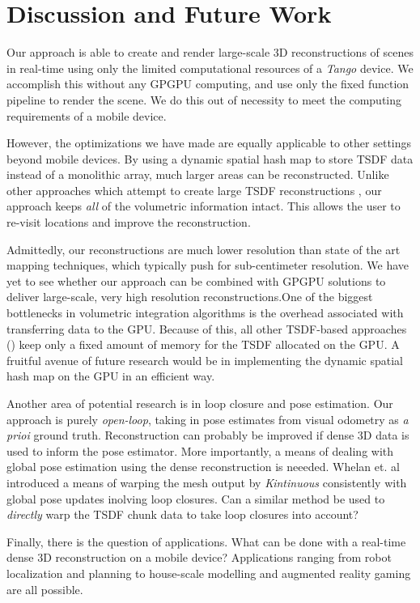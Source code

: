 \section{Discussion and Future Work}
Our approach is able to create and render large-scale 3D reconstructions of
scenes in real-time using only the limited computational resources of a
\textit{Tango} device. We accomplish this without any GPGPU computing, and use
only the fixed function pipeline to render the scene. We do this out of
necessity to meet the computing requirements of a mobile device.

However, the optimizations we have made are equally applicable to other
settings beyond mobile devices. By using a dynamic spatial hash map to store
TSDF data instead of a monolithic array, much larger areas can be
reconstructed. Unlike other approaches which attempt to create large TSDF
reconstructions \cite{Whelan2013}, our approach keeps \textit{all} of the
volumetric information intact. This allows the user to re-visit locations and
improve the reconstruction.

Admittedly, our reconstructions are much lower resolution than state of the art
mapping techniques, which typically push for sub-centimeter resolution. We have
yet to see whether our approach can be combined with GPGPU solutions to deliver
large-scale, very high resolution reconstructions.One of the biggest
bottlenecks in volumetric integration algorithms is the overhead associated
with transferring data to the GPU. Because of this, all other TSDF-based
approaches (\cite{Newcombe, Whelan2013, Bylow2013, Nguyen2012}) keep only a
fixed amount of memory for the TSDF allocated on the GPU. A fruitful avenue of
future research would be in implementing the dynamic spatial hash map on the GPU
in an efficient way. 

Another area of potential research is in loop closure and pose estimation. Our
approach is purely \textit{open-loop}, taking in pose estimates from visual
odometry as \textit{a prioi} ground truth. Reconstruction can probably be
improved if dense 3D data is used to inform the pose estimator. More
importantly, a means of dealing with global pose estimation using the dense
reconstruction is neeeded. Whelan et. al \cite{WhelanLoopClose} introduced a
means of warping the mesh output by \textit{Kintinuous} consistently with global
pose updates inolving loop closures. Can a similar method be used to
\textit{directly} warp the TSDF chunk data to take loop closures into account?

Finally, there is the question of applications. What can be done with a
real-time dense 3D reconstruction on a mobile device? Applications ranging from
robot localization and planning to house-scale modelling and augmented reality
gaming are all possible.

